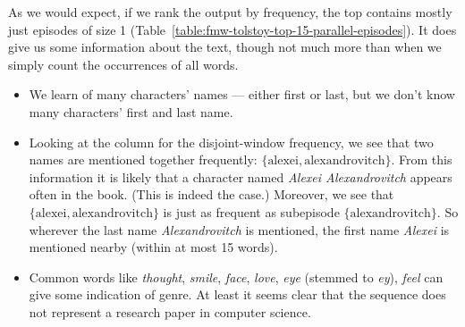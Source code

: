 \iffalse
As we saw in Section~\ref{sec:experiments-quality-episodes}, anti-monotonic frequency measures inherently put larger episodes at a disadvantage, since an episode is never more frequent than any of its subepisodes. This has a few effects:
\begin{itemize}
\item $ (l + 1) $-episodes will generally score lower than $ l $-episodes, so larger episodes will tend to be ranked lower than smalles ones.
\item As a consequence of the preceding, and because we mine according to a fixed frequency threshold, the number of $ l $-episodes found decreases strongly as $ l $ grows.
\end{itemize}
We can clearly see the second effect if we plot the number of frequent episodes grouped by size: Figure~\ref{fig:episode-frequencies-by-size} gives the numbers for one of the experiments performed in section~\ref{sec:performance-episodes}. We do see, however, that it helps to choose thresholds as low as possible, since the number greater-than-1-episodes rises significantly near the lowest thresholds. Still, larger episodes generally won't score highly compared to their subepisodes, and so they won't do well when episodes are ranked.
\fi

As we would expect, if we rank the output by frequency, the top contains mostly just episodes of size 1 (Table~\ref{table:fmw-tolstoy-top-15-parallel-episodes}). It does give us some information about the text, though not much more than when we simply count the occurrences of all words.

\begin{itemize}
\item We learn of many characters' names --- either first or last, but we don't know many characters' first and last name.
\item Looking at the column for the disjoint-window frequency, we see that two names are mentioned together frequently: $ \{ \text{alexei}, \text{alexandrovitch} \} $. From this information it is likely that a character named \emph{Alexei Alexandrovitch} appears often in the book. (This is indeed the case.) Moreover, we see that $ \{ \text{alexei}, \text{alexandrovitch} \} $ is just as frequent as subepisode $ \{ \text{alexandrovitch} \} $. So wherever the last name \emph{Alexandrovitch} is mentioned, the first name \emph{Alexei} is mentioned nearby (within at most 15 words).
\item Common words like \emph{thought}, \emph{smile}, \emph{face}, \emph{love}, \emph{eye} (stemmed to \emph{ey}), \emph{feel} can give some indication of genre. At least it seems clear that the sequence does not represent a research paper in computer science.

\end{itemize}

